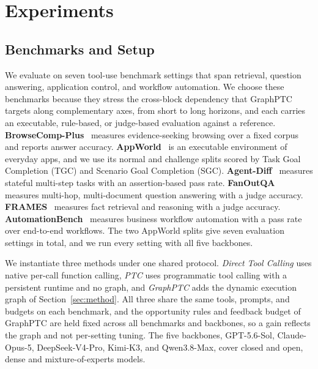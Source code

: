 \section{Experiments}

\subsection{Benchmarks and Setup}
\label{sec:experiments-setup}

We evaluate on seven tool-use benchmark settings that span retrieval, question answering, application control, and workflow automation.
We choose these benchmarks because they stress the cross-block dependency that GraphPTC targets along complementary axes, from short to long horizons, and each carries an executable, rule-based, or judge-based evaluation against a reference.
\textbf{BrowseComp-Plus}~\citep{chen2025browsecompplus} measures evidence-seeking browsing over a fixed corpus and reports answer accuracy.
\textbf{AppWorld}~\citep{trivedi2024appworld} is an executable environment of everyday apps, and we use its normal and challenge splits scored by Task Goal Completion (TGC) and Scenario Goal Completion (SGC).
\textbf{Agent-Diff}~\citep{pysklo2026agentdiff} measures stateful multi-step tasks with an assertion-based pass rate.
\textbf{FanOutQA}~\citep{zhu2024fanoutqa} measures multi-hop, multi-document question answering with a judge accuracy.
\textbf{FRAMES}~\citep{krishna2024frames} measures fact retrieval and reasoning with a judge accuracy.
\textbf{AutomationBench}~\citep{shepard2026automationbench} measures business workflow automation with a pass rate over end-to-end workflows.
The two AppWorld splits give seven evaluation settings in total, and we run every setting with all five backbones.

We instantiate three methods under one shared protocol.
\emph{Direct Tool Calling} uses native per-call function calling, \emph{PTC} uses programmatic tool calling with a persistent runtime and no graph, and \emph{GraphPTC} adds the dynamic execution graph of Section~\ref{sec:method}.
All three share the same tools, prompts, and budgets on each benchmark, and the opportunity rules and feedback budget of GraphPTC are held fixed across all benchmarks and backbones, so a gain reflects the graph and not per-setting tuning.
The five backbones, GPT-5.6-Sol, Claude-Opus-5, DeepSeek-V4-Pro, Kimi-K3, and Qwen3.8-Max, cover closed and open, dense and mixture-of-experts models.



